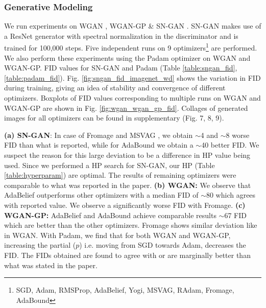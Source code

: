 \subsubsection{Generative Modeling}
\label{lab:Generative_modeling}
 We run experiments on WGAN \cite{WGAN}, WGAN-GP \cite{WGAN-GP} \& SN-GAN \cite{SN-GAN}. SN-GAN makes use of a ResNet generator with spectral normalization in the discriminator and is trained for 100,000 steps. Five independent runs on 9 optimizers\footnote{\label{fnote:optim_list_gan}SGD, Adam, RMSProp, AdaBelief, Yogi, MSVAG, RAdam, Fromage, AdaBound} are performed. We also perform these experiments using the Padam \cite{padam} optimizer on WGAN and WGAN-GP.  FID values for SN-GAN and Padam (Table \ref{table:sngan_fid}, \ref{table:padam_fid}). Fig. \ref{fig:sngan_fid_imagenet_wd} shows the variation in FID during training, giving an idea of stability and convergence of different optimizers. Boxplots of FID values corresponding to multiple runs on WGAN and WGAN-GP are shown in Fig. \ref{fig:wgan_wgan_gp_fid}. Collages of generated images for all optimizers can be found in supplementary (Fig. 7, 8, 9).
 
\textbf{(a) SN-GAN}: In case of Fromage \cite{Fromage} and MSVAG \cite{MSVAG}, we obtain $\sim$4 and $\sim$8 worse FID than what is reported, while for AdaBound \cite{AdaBound} we obtain a $\sim$40 better FID. We suspect the reason for this large deviation to be a difference in HP value being used. Since we performed a HP search for SN-GAN, our HP (Table \ref{table:hyperparam}) are optimal. The results of remaining optimizers were comparable to what was reported in the paper. \textbf{(b) WGAN:} We observe that AdaBelief outperforms other optimizers with a median FID of $\sim$80 which agrees with reported value. We observe a significantly worse FID with Fromage. \textbf{(c) WGAN-GP:} AdaBelief and AdaBound achieve comparable results $\sim$67 FID which are better than the other optimizers. Fromage shows similar deviation like in WGAN. With Padam, we find that for both WGAN and WGAN-GP, increasing the partial ($p$) i.e. moving from SGD towards Adam, decreases the FID. The FIDs obtained are found to agree with or are marginally better than what was stated in the paper.



